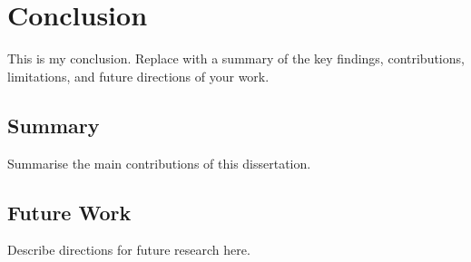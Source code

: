 \chapter{Conclusion}
\label{chap:conclusion}

This is my conclusion. Replace with a summary of the key findings,
contributions, limitations, and future directions of your work.

\section{Summary}
\label{sec:summary}

Summarise the main contributions of this dissertation.

\section{Future Work}
\label{sec:future}

Describe directions for future research here.
